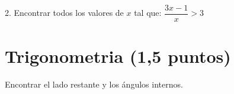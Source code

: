 \documentclass[a4paper,11pt,spanish,sans]{exam}
\begin{document}
2. Encontrar todos los valores de $x$ tal que: $\dfrac{3x-1}{x}>3$
\\

\section{Trigonometria (1,5 puntos)}

%		
%		
%		
%		
%		
%		
%		
Encontrar el lado restante y los ángulos internos.
\end{document}
